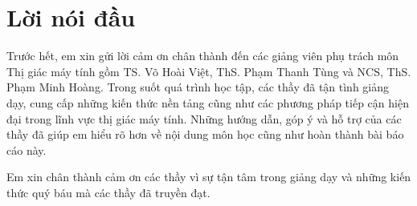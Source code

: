 \section*{Lời nói đầu}
Trước hết, em xin gửi lời cảm ơn chân thành đến các giảng viên phụ trách môn Thị giác máy tính gồm TS. Võ Hoài Việt, ThS. Phạm Thanh Tùng và NCS, ThS. Phạm Minh Hoàng. Trong suốt quá trình học tập, các thầy đã tận tình giảng dạy, cung cấp những kiến thức nền tảng cũng như các phương pháp tiếp cận hiện đại trong lĩnh vực thị giác máy tính. Những hướng dẫn, góp ý và hỗ trợ của các thầy đã giúp em hiểu rõ hơn về nội dung môn học cũng như hoàn thành bài báo cáo này.

Em xin chân thành cảm ơn các thầy vì sự tận tâm trong giảng dạy và những kiến thức quý báu mà các thầy đã truyền đạt.
